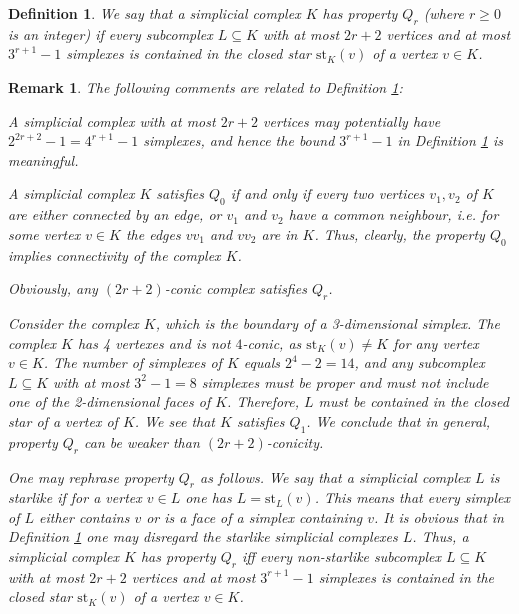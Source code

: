\documentclass[11pt,twoside, reqno]{amsart}
\theoremstyle{plain}
\newtheorem{remark}[lema]{Remark}
\theoremstyle{definition}
\newtheorem{defi}[lema]{Definition}
\newcommand{\st}{\textrm{st}}
\begin{document}
\begin{defi}\label{def:qr}{\it 
We say that a simplicial complex $K$ has property $Q_r$ (where $r\ge 0$ is an integer)
if every subcomplex $L\subseteq K$ with at most $2r+2$ vertices and at most $3^{r+1}-1$ simplexes is contained in the closed star $\st_K(v)$ of a vertex $v\in K$. }
\end{defi}
\begin{remark}\label{rk1} {\rm The following comments are related to Definition \ref{def:qr}:}
\begin{enumerate}
{\rm 
\item[{(1)}] 
A simplicial complex with at most $2r+2$ vertices may potentially have %
$2^{2r+2}-1=4^{r+1}-1$ simplexes, and hence the bound $3^{r+1}-1$ in Definition \ref{def:qr} is meaningful. 


\item[{(2)}] A simplicial complex $K$ satisfies $Q_0$ if and only if every two vertices $v_1, v_2$ of $K$ are 
either connected by an edge, or $v_1$ and $v_2$ have a common neighbour, i.e. for some vertex $v\in K$ the edges $vv_1$ and $vv_2$ are in $K$. 
Thus, clearly, the property $Q_0$ implies connectivity of the complex $K$. 

\item[{(3)}] Obviously, any $(2r+2)$-conic complex satisfies $Q_r$. 

\item[{(4)}] Consider the complex $K$, which is the boundary of a 3-dimensional simplex. 
The complex $K$ has 4 vertexes and is not $4$-conic, as $\st_K(v)\not= K$ for any vertex $v\in K$. 
The number of simplexes of $K$ equals $2^4-2=14$, and 
any subcomplex $L\subseteq K$ with at most $3^2-1=8$ simplexes must be proper and must not include one of the 2-dimensional faces of $K$. Therefore,
 $L$ must be contained in the closed star of a vertex of $K$. We see that $K$
 satisfies $Q_1$. 
 We conclude that  {\it in general, property
$Q_r$ can be weaker than $(2r+2)$-conicity. }

\item[{(5)}] One may rephrase property $Q_r$ as follows. We say that a simplicial complex $L$ is starlike if for a vertex $v\in L$ one has 
$L= \st_L(v)$. This means that every simplex of $L$ either contains $v$ or is a face of a simplex containing $v$. 
It is obvious that in Definition \ref{def:qr} one may disregard the starlike simplicial complexes $L$. Thus, a simplicial complex $K$ has property $Q_r$ 
iff every non-starlike subcomplex $L\subseteq K$ with at most $2r+2$ vertices and at most $3^{r+1}-1$ simplexes is contained in the closed star $\st_K(v)$ of a vertex $v\in K$.
}
\end{enumerate}
\end{remark}
\end{document}
